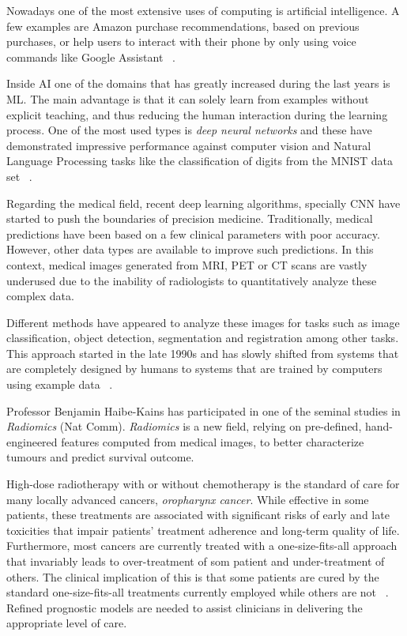 

Nowadays one of the most extensive uses of computing is artificial intelligence. A few 
examples are Amazon purchase recommendations, based on previous purchases, or help users
to interact with their phone by only using voice commands like Google Assistant 
~\cite{neural:amazon, neural:google-assistant}.

Inside AI one of the domains that has greatly increased during the last years is 
\gls{ML}. The main advantage is that it can solely learn from examples without explicit 
teaching, and thus reducing the human interaction during the learning process. One of the 
most used types is \emph{deep neural networks} and these have demonstrated impressive 
performance against computer vision and Natural Language Processing tasks like the 
classification of digits from the MNIST data set
~\cite{neural:mnist, neural:empirical-evaluation-deep-architectures}.

Regarding the medical field, recent deep learning algorithms, specially \gls{CNN} 
have started to push the boundaries of precision medicine. Traditionally, medical 
predictions have been based on a few clinical parameters with poor accuracy.
However, other data types are available to improve such predictions. In this context, 
medical images generated from \gls{MRI}, \gls{PET} or \gls{CT} scans are vastly 
underused due to the inability of radiologists to quantitatively analyze these 
complex data.

Different methods have appeared to analyze these images for tasks such as image 
classification, object detection, segmentation and registration among other tasks. This
approach started in the late 1990s and has slowly shifted from systems that are 
completely designed by humans to systems that are trained by computers using example data
~\cite{medical:survey-deep-learning}.

Professor Benjamin Haibe-Kains has participated in one of the seminal studies in 
\emph{Radiomics} (Nat Comm). \emph{Radiomics} is a new field, relying on pre-defined, 
hand-engineered features computed from medical images, to better characterize tumours 
and predict survival outcome.

High-dose radiotherapy with or without chemotherapy is the standard of care for many
locally advanced cancers, \emph{oropharynx cancer}. While effective in some patients,
these treatments are associated with significant risks of early and late toxicities
that impair patients' treatment adherence and long-term quality of life. Furthermore, 
most cancers are currently treated with a one-size-fits-all approach that invariably leads
to over-treatment of som patient and under-treatment of others. 
The clinical implication of this is that some patients are cured by the standard 
one-size-fits-all treatments currently employed while others are not 
~\cite{medical:personalized}. Refined prognostic 
models are needed to assist clinicians in delivering the appropriate level of care.


